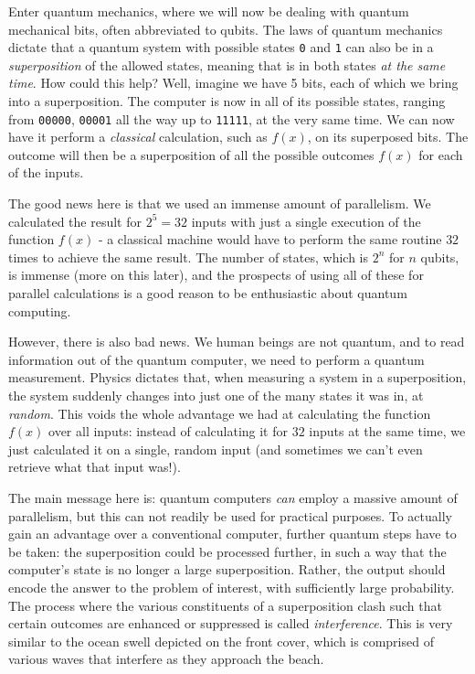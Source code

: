 Enter quantum mechanics, where we will now be dealing with quantum mechanical bits, often abbreviated to qubits. The laws of quantum mechanics dictate that a quantum system with possible states \texttt{0} and \texttt{1} can also be in a \emph{superposition} of the allowed states, meaning that is in both states \emph{at the same time}. How could this help? Well, imagine we have 5 bits, each of which we bring into a superposition. The computer is now in all of its possible states, ranging from \texttt{00000}, \texttt{00001} all the way up to \texttt{11111}, at the very same time. We can now have it perform a \emph{classical} calculation, such as $f(x)$, on its superposed bits. The outcome will then be a superposition of all the possible outcomes $f(x)$ for each of the inputs. 

The good news here is that we used an immense amount of parallelism. We calculated the result for $2^5 = 32$ inputs with just a single execution of the function $f(x)$ - a classical machine would have to perform the same routine $32$ times to achieve the same result. The number of states, which is $2^n$ for $n$ qubits, is immense (more on this later), and the prospects of using all of these for parallel calculations is a good reason to be enthusiastic about quantum computing. 

However, there is also bad news. We human beings are not quantum, and to read information out of the quantum computer, we need to perform a quantum measurement. Physics dictates that, when measuring a system in a superposition, the system suddenly changes into just one of the many states it was in, at \emph{random}. This voids the whole advantage we had at calculating the function $f(x)$ over all inputs: instead of calculating it for $32$ inputs at the same time, we just calculated it on a single, random input (and sometimes we can't even retrieve what that input was!). 

The main message here is: quantum computers \emph{can} employ a massive amount of parallelism, but this can not readily be used for practical purposes. To actually gain an advantage over a conventional computer, further quantum steps have to be taken: the superposition could be processed further, in such a way that the computer's state is no longer a large superposition. Rather, the output should encode the answer to the problem of interest, with sufficiently large probability. The process where the various constituents of a superposition clash such that certain outcomes are enhanced or suppressed is called \emph{interference}. This is very similar to the ocean swell depicted on the front cover, which is comprised of various waves that interfere as they approach the beach. 



